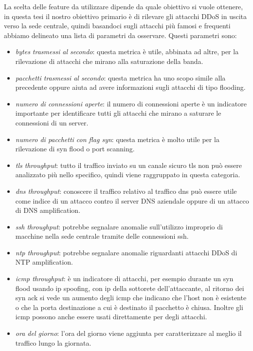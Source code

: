 La scelta delle feature da utilizzare dipende da quale obiettivo si vuole ottenere, in questa tesi il nostro obiettivo primario è di rilevare gli attacchi DDoS in uscita verso la sede centrale, quindi basandoci sugli attacchi più famosi e frequenti abbiamo delineato una lista di parametri da osservare. Questi parametri sono:
\begin{itemize}
    \item \emph{bytes trasmessi al secondo}: questa metrica è utile, abbinata ad altre, per la rilevazione di attacchi che mirano alla saturazione della banda.
    \item \emph{pacchetti trasmessi al secondo}: questa metrica ha uno scopo simile alla precedente oppure aiuta ad avere informazioni sugli attacchi di tipo flooding.
    \item \emph{numero di connessioni aperte}: il numero di connessioni aperte è un indicatore importante per identificare tutti gli attacchi che mirano a saturare le connessioni di un server. %
    \item \emph{numero di pacchetti con flag syn}: questa metrica è molto utile per la rilevazione di syn flood o port scanning.
    \item \emph{tls throughput}: tutto il traffico inviato su un canale sicuro tls non può essere analizzato più nello specifico, quindi viene raggruppato in questa categoria.
    \item \emph{dns throughput}: conoscere il traffico relativo al traffico dns può essere utile come indice di un attacco contro il server DNS aziendale oppure di un attacco di DNS amplification.
    \item \emph{ssh throughput}: potrebbe segnalare anomalie sull'utilizzo improprio di macchine nella sede centrale tramite delle connessioni ssh.
    \item \emph{ntp throughput}: potrebbe segnalare anomalie riguardanti attacchi DDoS di NTP amplification.
    \item \emph{icmp throughput}: è un indicatore di attacchi, per esempio durante un syn flood usando ip spoofing, con ip della sottorete dell'attaccante, al ritorno dei syn ack si vede un aumento degli icmp che indicano che l'host non è esistente o che la porta destinazione a cui è destinato il pacchetto è chiusa. Inoltre gli icmp possono anche essere usati direttamente per degli attacchi.
    \item \emph{ora del giorno}: l'ora del giorno viene aggiunta per caratterizzare al meglio il traffico lungo la giornata.
\end{itemize}

